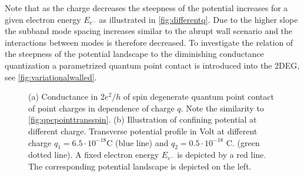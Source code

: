 Note that as the charge decreases the steepness of the potential increases for a given electron energy $E_{e^-}$ as illustrated in \cref{fig:differentq}. Due to the higher slope the subband mode spacing increases similar to the abrupt wall scenario and the interactions between modes is therefore decreased.
 To investigate the relation of the steepness of the potential landscape to the diminishing conductance quantization a parametrized  quantum point contact is introduced into the 2DEG, see \cref{fig:variationalwalled}.
\begin{figure}[h]
  \centering
  \caption{(a) Conductance in 2$e^2/h$ of spin degenerate quantum point contact of point charges in dependence of charge $q$. Note the similarity to \cref{fig:qpcpointtransspin}. (b) Illustration of confining potential at different charge. Transverse potential profile in Volt at different charge $q_1 = 6.5 \cdot 10^{-18}$C (blue line) and $q_2= 0.5 \cdot 10^{-18}$ C. (green dotted line). A fixed electron energy $E_{e^-}$ is depicted by a red line. The corresponding potential landscape is depicted on the left.}\label{fig:pointtrans}
\end{figure}
\FloatBarrier
